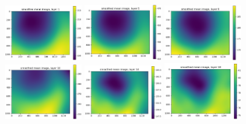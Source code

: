 \documentclass[letterpaper,11pt]{article}
\begin{document}
\begin{figure}[!ht]
\centering
\includegraphics[width=0.3\textwidth]{images/results/smoothed_mean_image_layers_vectra/smoothed_mean_image_layer_1}
\includegraphics[width=0.3\textwidth]{images/results/smoothed_mean_image_layers_vectra/smoothed_mean_image_layer_5}
\includegraphics[width=0.3\textwidth]{images/results/smoothed_mean_image_layers_vectra/smoothed_mean_image_layer_9}
\includegraphics[width=0.3\textwidth]{images/results/smoothed_mean_image_layers_vectra/smoothed_mean_image_layer_10}
\includegraphics[width=0.3\textwidth]{images/results/smoothed_mean_image_layers_vectra/smoothed_mean_image_layer_14}
\includegraphics[width=0.3\textwidth]{images/results/smoothed_mean_image_layers_vectra/smoothed_mean_image_layer_18}

\end{figure}
\end{document}
